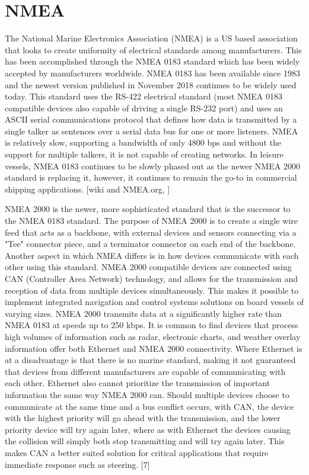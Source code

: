 \documentclass{article}
\begin{document}
\section{NMEA}
The National Marine Electronics Association (NMEA) is a US based association that looks to create uniformity of electrical standards among manufacturers. This has been accomplished through the NMEA 0183 standard which has been widely accepted by manufacturers worldwide. NMEA 0183 has been available since 1983 and the newest version published in November 2018 continues to be widely used today. This standard uses the RS-422 electrical standard (most NMEA 0183 compatible devices also capable of driving a single RS-232 port) and uses an ASCII serial communications protocol that defines how data is transmitted by a single talker as sentences over a serial data bus for one or more listeners. NMEA is relatively slow, supporting a bandwidth of only 4800 bps and without the support for multiple talkers, it is not capable of creating networks. In leisure vessels, NMEA 0183 continues to be slowly phased out as the newer NMEA 2000 standard is replacing it, however, it continues to remain the go-to in commercial shipping applications.
[wiki and NMEA.org, ] 

NMEA 2000 is the newer, more sophisticated standard that is the successor to the NMEA 0183 standard. The purpose of NMEA 2000 is to create a single wire feed that acts as a backbone, with external devices and sensors connecting via a "Tee" connector piece, and a terminator connector on each end of the backbone. Another aspect in which NMEA differs is in how devices communicate with each other using this standard. NMEA 2000 compatible devices are connected using CAN (Controller Area Network) technology, and allows for the transmission and reception of data from multiple devices simultaneously. This makes it possible to implement integrated navigation and control systems solutions on board vessels of varying sizes. NMEA 2000 transmits data at a significantly higher rate than NMEA 0183 at speeds up to 250 kbps. It is common to find devices that process high volumes of information such as radar, electronic charts, and weather overlay information offer both Ethernet and NMEA 2000 connectivity. Where Ethernet is at a disadvantage is that there is no marine standard, making it not guaranteed that devices from different manufacturers are capable of communicating with each other. Ethernet also cannot prioritize the transmission of important information the same way NMEA 2000 can. Should multiple devices choose to communicate at the same time and a bus conflict occurs, with CAN, the device with the highest priority will go ahead with the transmission, and the lower priority device will try again later, where as with Ethernet the devices causing the collision will simply both stop transmitting and will try again later. This makes CAN a better suited solution for critical applications that require immediate response such as steering.
[7]   
\end{document}
